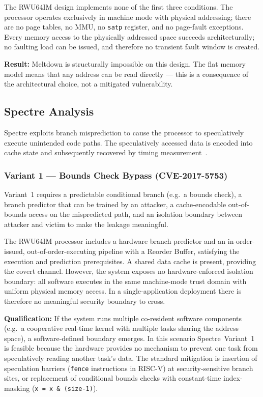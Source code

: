 The RWU64IM design implements none of the first three conditions.  The processor
operates exclusively in machine mode with physical addressing; there are no page
tables, no MMU, no \texttt{satp} register, and no page-fault exceptions.  Every
memory access to the physically addressed space succeeds architecturally; no faulting
load can be issued, and therefore no transient fault window is created.

\textbf{Result:} Meltdown is structurally impossible on this design.  The flat memory
model means that any address can be read directly — this is a consequence of the
architectural choice, not a mitigated vulnerability.

\subsection{Spectre Analysis}

Spectre exploits branch misprediction to cause the processor to speculatively execute
unintended code paths.  The speculatively accessed data is encoded into cache state
and subsequently recovered by timing measurement~\cite{kocher2019spectre}.

\subsubsection{Variant 1 — Bounds Check Bypass (CVE-2017-5753)}

Variant~1 requires a predictable conditional branch (e.g.\ a bounds check), a branch
predictor that can be trained by an attacker, a cache-encodable out-of-bounds access
on the mispredicted path, and an isolation boundary between attacker and victim to
make the leakage meaningful.

The RWU64IM processor includes a hardware branch predictor and an in-order-issued,
out-of-order-executing pipeline with a Reorder Buffer, satisfying the execution and
prediction prerequisites.  A shared data cache is present, providing the covert
channel.  However, the system exposes no hardware-enforced isolation boundary:
all software executes in the same machine-mode trust domain with uniform physical
memory access.  In a single-application deployment there is therefore no meaningful
security boundary to cross.

\textbf{Qualification:} If the system runs multiple co-resident software components
(e.g.\ a cooperative real-time kernel with multiple tasks sharing the address space),
a software-defined boundary emerges.  In this scenario Spectre~Variant~1 is feasible
because the hardware provides no mechanism to prevent one task from speculatively
reading another task's data.  The standard mitigation is insertion of speculation
barriers (\texttt{fence} instructions in RISC-V) at security-sensitive branch sites,
or replacement of conditional bounds checks with constant-time index-masking
(\texttt{x = x \& (size-1)}).

